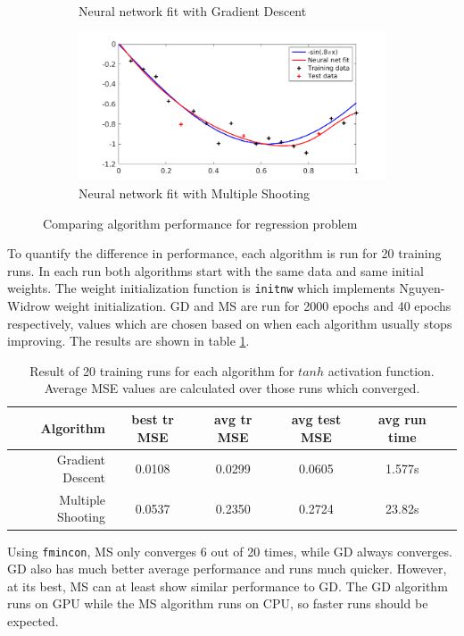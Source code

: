 \begin{figure}
\begin{subfigure}[b]{0.45\textwidth}
         \caption{Neural network fit with Gradient Descent}
         \label{gdfit}
     \end{subfigure}
     \begin{subfigure}[b]{0.45\textwidth}
         \centering
         \includegraphics[width=\textwidth]{fminfit}
         \caption{Neural network fit with Multiple Shooting}
         \label{fminfit}
     \end{subfigure}
    \caption{Comparing algorithm performance for regression problem}
    \label{compalg}
\end{figure}

To quantify the difference in performance, each algorithm is run for 20 training runs. In each run both algorithms start with the same data and same initial weights. The weight initialization function is \texttt{initnw} which implements Nguyen-Widrow weight initialization. GD and MS are run for 2000 epochs and 40 epochs respectively, values which are chosen based on when each algorithm usually stops improving. The results are shown in table \ref{tab:tanh}.

\begin{table}
	\centering
	\begin{tabular}{r | c c c c c}
		Algorithm & \small best tr MSE & \small avg tr MSE & \small avg test MSE & \small avg run time \\ \hline
		Gradient Descent & 0.0108 & 0.0299 & 0.0605 & 1.577s \\
		Multiple Shooting & 0.0537 & 0.2350 & 0.2724 & 23.82s \\
	\end{tabular}
	\caption{Result of 20 training runs for each algorithm for $tanh$ activation function. Average MSE values are calculated over those runs which converged.}
	\label{tab:tanh}
\end{table}

Using \texttt{fmincon}, MS only converges 6 out of 20 times, while GD always converges. GD also has much better average performance and runs much quicker. However, at its best, MS can at least show similar performance to GD. The GD algorithm runs on GPU while the MS algorithm runs on CPU, so faster runs should be expected.

